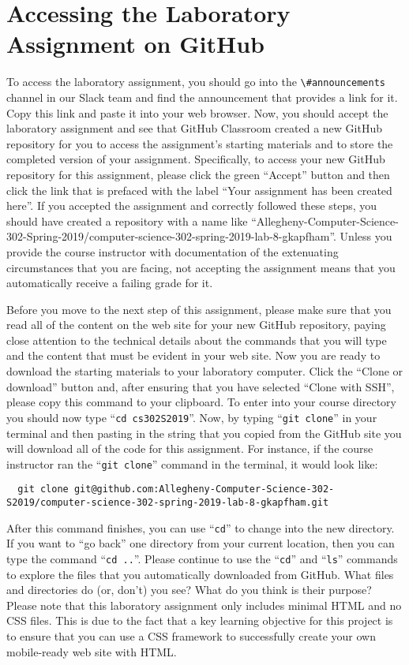 \documentclass[11pt]{article}
\newcommand{\command}[1]{``\lstinline{#1}''}
\newcommand{\channel}[1]{\lstinline{#1}}
\newcommand{\step}[1]{``{#1}''}
\begin{document}
\section*{Accessing the Laboratory Assignment on GitHub}

To access the laboratory assignment, you should go into the
\channel{\#announcements} channel in our Slack team and find the announcement
that provides a link for it. Copy this link and paste it into your web browser.
Now, you should accept the laboratory assignment and see that GitHub Classroom
created a new GitHub repository for you to access the assignment's starting
materials and to store the completed version of your assignment. Specifically,
to access your new GitHub repository for this assignment, please click the green
``Accept'' button and then click the link that is prefaced with the label ``Your
assignment has been created here''. If you accepted the assignment and correctly
followed these steps, you should have created a repository with a name like
``Allegheny-Computer-Science-302-Spring-2019/computer-science-302-spring-2019-lab-8-gkapfham''.
Unless you provide the course instructor with documentation of the extenuating
circumstances that you are facing, not accepting the assignment means that you
automatically receive a failing grade for it.

Before you move to the next step of this assignment, please make sure that you
read all of the content on the web site for your new GitHub repository, paying
close attention to the technical details about the commands that you will type
and the content that must be evident in your web site. Now you are ready to
download the starting materials to your laboratory computer. Click the ``Clone
or download'' button and, after ensuring that you have selected ``Clone with
SSH'', please copy this command to your clipboard. To enter into your course
directory you should now type \command{cd cs302S2019}. Now, by typing
\command{git clone} in your terminal and then pasting in the string that you
copied from the GitHub site you will download all of the code for this
assignment. For instance, if the course instructor ran the \command{git clone}
command in the terminal, it would look like:

\begin{lstlisting}
  git clone git@github.com:Allegheny-Computer-Science-302-S2019/computer-science-302-spring-2019-lab-8-gkapfham.git
\end{lstlisting}

After this command finishes, you can use \command{cd} to change into the new
directory. If you want to \step{go back} one directory from your current
location, then you can type the command \command{cd ..}. Please continue to use
the \command{cd} and \command{ls} commands to explore the files that you
automatically downloaded from GitHub. What files and directories do (or, don't)
you see? What do you think is their purpose? Please note that this laboratory
assignment only includes minimal HTML and no CSS files. This is due to the fact
that a key learning objective for this project is to ensure that you can use a
CSS framework to successfully create your own mobile-ready web site with HTML.
\end{document}
